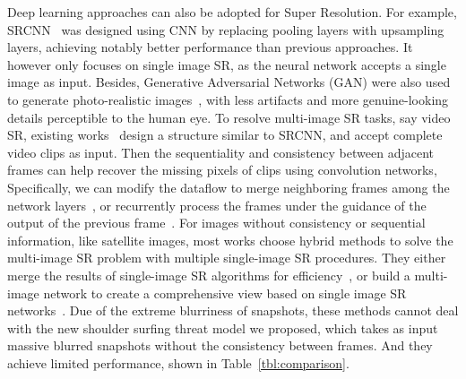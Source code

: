 Deep learning approaches can also be adopted for Super Resolution. For example, SRCNN~\cite{dong2015image} was designed using CNN by replacing pooling layers with upsampling layers, achieving notably better performance than previous approaches. It however only focuses on single image SR, as the neural network accepts a single image as input. Besides, Generative Adversarial Networks (GAN) were also used to generate photo-realistic images~\cite{ledig2017photo}, with less artifacts and more genuine-looking details perceptible to the human eye. To resolve multi-image SR tasks, say video SR, existing works~\cite{shi2016real, kappeler2016video} design a structure similar to SRCNN, and accept complete video clips as input. Then the sequentiality and consistency between adjacent frames can help recover the missing pixels of clips using convolution networks, Specifically,
we can modify the dataflow to merge neighboring frames among the network layers~\cite{huang2017video}, or recurrently process the frames under the guidance of the output of the previous frame~\cite{sajjadi2018frame}. For images without consistency or sequential information, like satellite images, most works choose hybrid methods to solve the multi-image SR problem with multiple single-image SR procedures. They either merge the results of single-image SR algorithms for efficiency~\cite{kawulok2019deep}, or build a multi-image network to create a comprehensive view based on single image SR networks~\cite{8834937}. Due of the extreme blurriness of snapshots, these methods cannot deal with the new shoulder surfing threat model we proposed, which takes as input massive blurred snapshots without the consistency between frames. And they achieve limited performance, shown in Table~\ref{tbl:comparison}.

